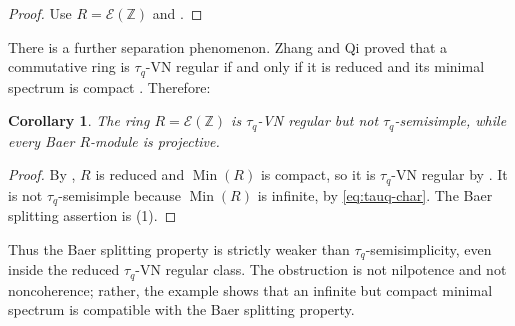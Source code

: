 \documentclass[11pt]{article}
\newtheorem{corollary}[corollary]{Corollary}
\theoremstyle{definition}
\theoremstyle{remark}
\newcommand{\Min}{\operatorname{Min}}
\newcommand{\EC}{\mathcal E}
\begin{document}
\begin{proof}
Use $R=\EC(\mathbb Z)$ and .
\end{proof}

There is a further separation phenomenon.  Zhang and Qi proved that a
commutative ring is $\tau_q$-VN regular if and only if it is reduced and its
minimal spectrum is compact \cite{ZQflat}.  Therefore:

\begin{corollary}\label{cor:tauqVN}
The ring $R=\EC(\mathbb Z)$ is $\tau_q$-VN regular but not
$\tau_q$-semisimple, while every Baer $R$-module is projective.
\end{corollary}

\begin{proof}
By , $R$ is reduced and $\Min(R)$ is compact, so it is
$\tau_q$-VN regular by \cite{ZQflat}.  It is not $\tau_q$-semisimple because
$\Min(R)$ is infinite, by \eqref{eq:tauq-char}.  The Baer splitting assertion
is (1).
\end{proof}

Thus the Baer splitting property is strictly weaker than
$\tau_q$-semisimplicity, even inside the reduced $\tau_q$-VN regular class.
The obstruction is not nilpotence and not noncoherence; rather, the example
shows that an infinite but compact minimal spectrum is compatible with the
Baer splitting property.
\end{document}
